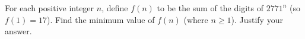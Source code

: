 For each positive integer $n$, define $f(n)$ to be the sum of the digits of
$2771^n$ (so $f(1) = 17$). Find the minimum value of $f(n)$ (where $n \ge 1$).
Justify your answer.
